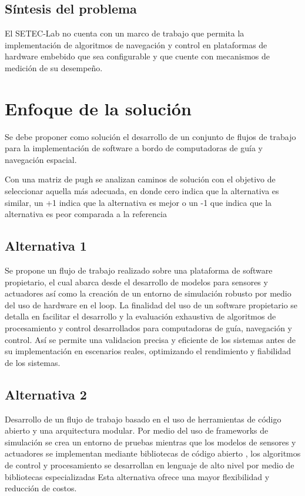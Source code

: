 \documentclass[12pt]{article}
\begin{document}
\subsection{Síntesis del problema}

El SETEC-Lab no cuenta con un marco de trabajo que permita la implementación de algoritmos de navegación  y control en plataformas de hardware embebido que sea configurable y que cuente con mecanismos de medición de su desempeño.


\section{Enfoque de la solución}

Se debe proponer como solución el desarrollo de un conjunto de flujos de trabajo para la implementación de software a bordo de computadoras de guía y navegación espacial.

Con una matriz de pugh se analizan caminos de solución con el objetivo de seleccionar aquella más adecuada, en donde cero indica que la alternativa es similar, un +1 indica que la alternativa es mejor o un -1 que indica que la alternativa es peor comparada a la referencia


\subsection{Alternativa 1}

Se propone un flujo de trabajo realizado sobre una plataforma de software propietario, el cual abarca desde el desarrollo de modelos para sensores y actuadores así como la creación de un entorno de simulación robusto por medio del uso de hardware en el loop. La finalidad del uso de un software propietario se detalla en facilitar el desarrollo y la evaluación exhaustiva de algoritmos de procesamiento y control desarrollados para computadoras de guía, navegación y control. Así se permite una validacion precisa y eficiente de los sistemas antes de su implementación en escenarios reales, optimizando el rendimiento y fiabilidad de los sistemas.

\subsection{Alternativa 2}

Desarrollo de un flujo de trabajo basado en el uso de herramientas de código abierto y una arquitectura modular. Por medio del uso de frameworks de simulación se crea un entorno de pruebas mientras que los modelos de sensores y actuadores se implementan mediante bibliotecas de código abierto , los algoritmos de control y procesamiento se desarrollan en lenguaje de alto nivel por medio de bibliotecas especializadas Esta alternativa ofrece una mayor flexibilidad y reducción de costos.
\end{document}
